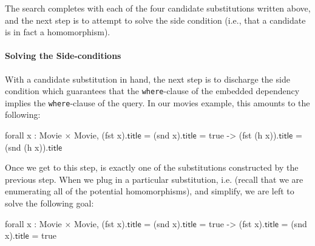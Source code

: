 \documentclass[preprint]{sigplanconf}
\newcommand{\ltac}[0]{\ensuremath{\mathcal{L}_{\mathrm{tac}}}}
\begin{document}

The search completes with each of the four candidate substitutions written above, and the next step is to attempt to solve the side condition (i.e., that a candidate is in fact a homomorphism).

\paragraph{Solving the Side-conditions}
With a candidate substitution in hand, the next step is to discharge the side condition which guarantees that the {\tt where}-clause of the embedded dependency implies the {\tt where}-clause of the query.  In our movies example, this amounts to the following: %
\begin{coq}
forall x : Movie $\times$ Movie, (fst x).$\textsf{title}$ = (snd x).$\textsf{title}$ = true
     -> (fst (h x)).$\textsf{title}$ = (snd (h x)).$\textsf{title}$
\end{coq}

Once we get to this step,  is exactly one of the substitutions constructed by the previous step.
When we plug in a particular substitution, i.e.  (recall that we are enumerating all of the potential homomorphisms), and simplify, we are left to solve the following goal: %
\begin{coq}
forall x : Movie $\times$ Movie, (fst x).$\textsf{title}$ = (snd x).$\textsf{title}$ = true
     -> (fst x).$\textsf{title}$ = (snd x).$\textsf{title}$ = true
\end{coq}
\end{document}
